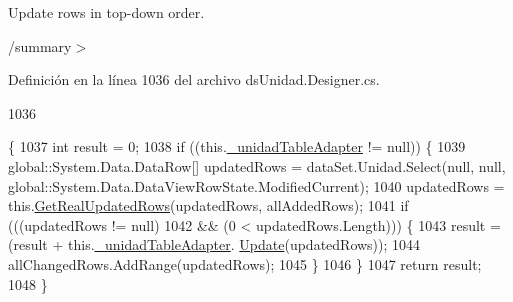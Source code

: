 Update rows in top-\/down order. 

/summary$>$ 

Definición en la línea 1036 del archivo ds\-Unidad.\-Designer.\-cs.


\begin{DoxyCode}
1036                                                                                                            
                                                                                                                  
       \{
1037             \textcolor{keywordtype}{int} result = 0;
1038             \textcolor{keywordflow}{if} ((this.\hyperlink{class_proyecto___integrador__3_1_1ds_unidad_table_adapters_1_1_table_adapter_manager_ad273398026bf55cc8cff4c34547f7564}{\_unidadTableAdapter} != null)) \{
1039                 global::System.Data.DataRow[] updatedRows = dataSet.Unidad.Select(null, null, 
      global::System.Data.DataViewRowState.ModifiedCurrent);
1040                 updatedRows = this.\hyperlink{class_proyecto___integrador__3_1_1ds_unidad_table_adapters_1_1_table_adapter_manager_a886b0eff24cf3bb231a4fcffef18db71}{GetRealUpdatedRows}(updatedRows, allAddedRows);
1041                 \textcolor{keywordflow}{if} (((updatedRows != null) 
1042                             && (0 < updatedRows.Length))) \{
1043                     result = (result + this.\hyperlink{class_proyecto___integrador__3_1_1ds_unidad_table_adapters_1_1_table_adapter_manager_ad273398026bf55cc8cff4c34547f7564}{\_unidadTableAdapter}.
      \hyperlink{class_proyecto___integrador__3_1_1ds_unidad_table_adapters_1_1_unidad_table_adapter_ab66b8ee5e1153ac309331e6234ba7fad}{Update}(updatedRows));
1044                     allChangedRows.AddRange(updatedRows);
1045                 \}
1046             \}
1047             \textcolor{keywordflow}{return} result;
1048         \}
\end{DoxyCode}


